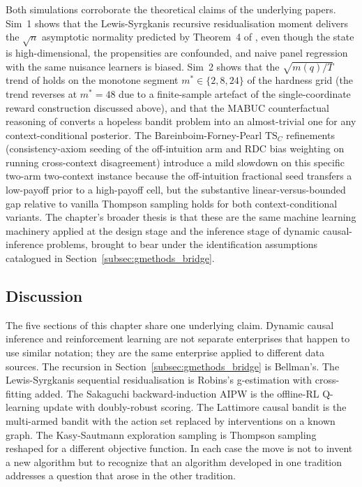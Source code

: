 Both simulations corroborate the theoretical claims of the underlying papers. Sim~1 shows that the Lewis-Syrgkanis recursive residualisation moment delivers the $\sqrt n$ asymptotic normality predicted by Theorem~4 of \citet{lewisSyrgkanis2021dynamicDML}, even though the state is high-dimensional, the propensities are confounded, and naive panel regression with the same nuisance learners is biased. Sim~2 shows that the $\sqrt{m(q)/T}$ trend of \citet[Theorems~1--2]{lattimore2016causal} holds on the monotone segment $m^* \in \{2, 8, 24\}$ of the hardness grid (the trend reverses at $m^* = 48$ due to a finite-sample artefact of the single-coordinate reward construction discussed above), and that the MABUC counterfactual reasoning of \citet{bareinboim2015mabuc} converts a hopeless bandit problem into an almost-trivial one for any context-conditional posterior. The Bareinboim-Forney-Pearl $\mathrm{TS}_C$ refinements (consistency-axiom seeding of the off-intuition arm and RDC bias weighting on running cross-context disagreement) introduce a mild slowdown on this specific two-arm two-context instance because the off-intuition fractional seed transfers a low-payoff prior to a high-payoff cell, but the substantive linear-versus-bounded gap relative to vanilla Thompson sampling holds for both context-conditional variants. The chapter's broader thesis is that these are the same machine learning machinery applied at the design stage and the inference stage of dynamic causal-inference problems, brought to bear under the identification assumptions catalogued in Section~\ref{subsec:gmethods_bridge}.

\subsection{Discussion}
\label{subsec:rl_for_ci_discussion}

The five sections of this chapter share one underlying claim. Dynamic causal inference and reinforcement learning are not separate enterprises that happen to use similar notation; they are the same enterprise applied to different data sources. The recursion in Section~\ref{subsec:gmethods_bridge} is Bellman's. The Lewis-Syrgkanis sequential residualisation is Robins's g-estimation with cross-fitting added. The Sakaguchi backward-induction AIPW is the offline-RL Q-learning update with doubly-robust scoring. The Lattimore causal bandit is the multi-armed bandit with the action set replaced by interventions on a known graph. The Kasy-Sautmann exploration sampling is Thompson sampling reshaped for a different objective function. In each case the move is not to invent a new algorithm but to recognize that an algorithm developed in one tradition addresses a question that arose in the other tradition.

